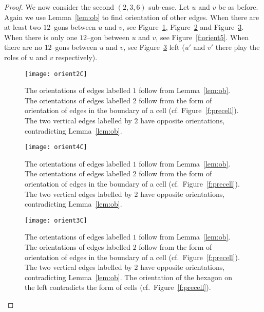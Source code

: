 \documentclass[11pt]{amsart}
\theoremstyle{definition}
\begin{document}
\begin{proof}
We now consider the second $(2,3,6)$ sub-case. Let $u$ and $v$ be as before. Again we use Lemma~\ref{lem:ob} to find orientation of other edges. When there are at least two $12$--gons between $u$ and $v$, see Figure~\ref{f:orient2}, Figure~\ref{f:orient4} and Figure~\ref{f:orient3}. When there is only one $12$--gon between $u$ and $v$, see Figure~\ref{f:orient5}. When there are no $12$--gons between $u$ and $v$, see Figure~\ref{f:orient3} left ($u'$ and $v'$ there play the roles of $u$ and $v$ respectively). 

\begin{figure}[h!]
	\centering
	\texttt{[image: orient2C]}
	\caption{The orientations of edges labelled $1$ follow from Lemma~\ref{lem:ob}. The orientations
		of edges labelled $2$ follow from the form of orientation of edges in the boundary of a cell (cf. Figure~\ref{f:precell}). The two vertical edges labelled by $2$
		have opposite orientations, contradicting Lemma~\ref{lem:ob}. 
	}
	\label{f:orient2}
\end{figure}

\begin{figure}[h!]
	\centering
	\texttt{[image: orient4C]}
	\caption{The orientations of edges labelled $1$ follow from Lemma~\ref{lem:ob}. The orientations
		of edges labelled $2$ follow from the form of orientation of edges in the boundary of a cell (cf.\ Figure~\ref{f:precell}). The two vertical edges labelled by $2$
		have opposite orientations, contradicting Lemma~\ref{lem:ob}. 
		}
	\label{f:orient4}
\end{figure}

\begin{figure}[h!]
	\centering
	\texttt{[image: orient3C]}
	\caption{The orientations of edges labelled $1$ follow from Lemma~\ref{lem:ob}. The orientations
		of edges labelled $2$ follow from the form of orientation of edges in the boundary of a cell (cf.\ Figure~\ref{f:precell}). The two vertical edges labelled by $2$ 
		have opposite orientations, contradicting Lemma~\ref{lem:ob}. The orientation of the hexagon on the left contradicts the form of cells (cf.\ Figure~\ref{f:precell}).}
	\label{f:orient3}
\end{figure}


\end{proof}
\end{document}
